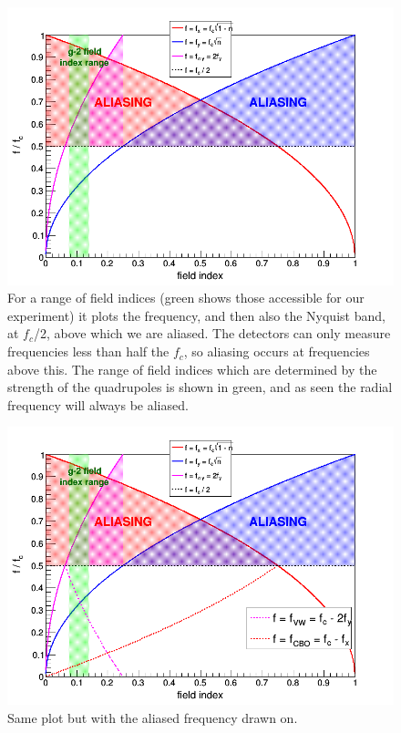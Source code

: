 \begin{figure}[!h]
\centering 
\includegraphics[scale=0.5]{Figures/freq_vs_n.png}
\decoRule
\caption{For a range of field indices (green shows those accessible for our experiment) it plots the frequency, and then also the Nyquist band, at $f_{c}$/2, above which we are aliased. The detectors can only measure frequencies less than half the $f_{c}$, so aliasing occurs at frequencies above this. The range of field indices which are determined by the strength of the quadrupoles is shown in green, and as seen the radial frequency will always be aliased.}
\label{fig:freq_vs_n.png}
\end{figure}

\begin{figure}[!h]
\centering 
\includegraphics[scale=0.5]{Figures/freq_vs_n_alias.png}
\decoRule
\caption{Same plot but with the aliased frequency drawn on.}
\label{fig:freq_vs_n_alias.png}
\end{figure}

